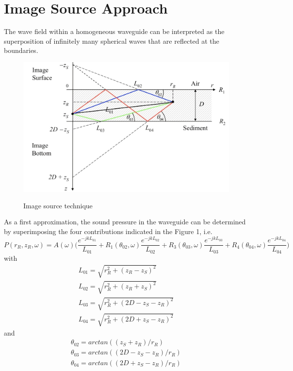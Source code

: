 \section{ Image Source Approach } \label{ Image Source Approach }
\noindent The wave field within a homogeneous waveguide can be interpreted as the superposition of infinitely many spherical waves that are reflected at the boundaries.
\begin{figure}[H]
\centering
{\includegraphics[scale=0.35]{usp1.jpg}}
\caption{ Image source technique }
\end{figure}
\noindent  As a first approximation, the sound pressure in the waveguide can be determined by superimposing the four contributions indicated in the Figure 1, i.e.
\begin{equation}
\textit{$P(r_R, z_R,\omega)$} = A(\omega) \Bigg( \frac{e^{-jkL_{01}}}{L_{01}} + R_{1}(\theta_{02},\omega) \frac{e^{-jkL_{02}}}{L_{02}} +  R_{3}(\theta_{03},\omega) \frac{e^{-jkL_{03}}}{L_{03}} +  R_{4}(\theta_{04},\omega) \frac{e^{-jkL_{04}}}{L_{04}}  \Bigg)
\end{equation}
\noindent with
\begin{equation}
\begin{gathered} 
L_{01}  = \sqrt{r_{R}^{2} + ( z_{R} - z_{S})^{2}} \\
L_{02}  = \sqrt{r_{R}^{2} + ( z_{R} + z_{S})^{2}} \\
L_{03}  = \sqrt{r_{R}^{2} + (2D - z_{S} - z_{R})^{2}} \\
L_{04}  = \sqrt{r_{R}^{2} + (2D + z_{S} - z_{R})^{2}}
\end{gathered} 
\end{equation}
\noindent and
\begin{equation}
\begin{gathered} 
\theta_{02}  = arctan((z_{S} + z_{R}) / r_{R}) \\
\theta_{03}  = arctan((2D - z_{S} - z_{R}) / r_{R}) \\
\theta_{04}  = arctan((2D + z_{S} - z_{R}) / r_{R})
\end{gathered} 
\end{equation}
